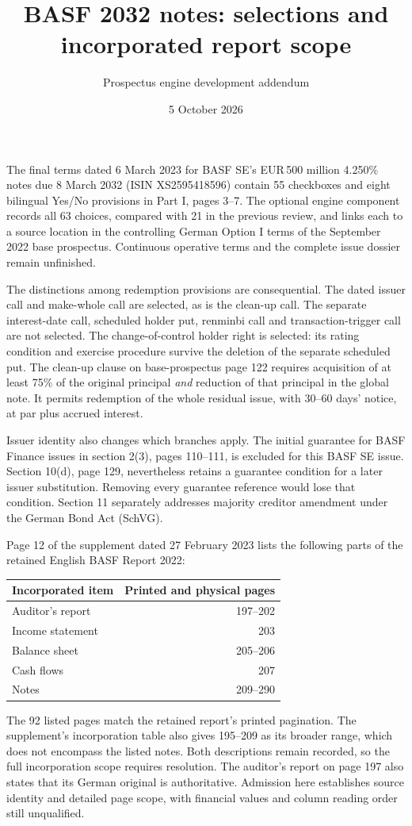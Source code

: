 \documentclass[11pt]{article}
\title{BASF 2032 notes: selections and incorporated report scope}
\author{Prospectus engine development addendum}
\date{5 October 2026}
\begin{document}
\maketitle
The final terms dated 6 March 2023 for BASF SE's EUR\,500 million
4.250\% notes due 8 March 2032 (ISIN XS2595418596) contain 55 checkboxes
and eight bilingual Yes/No provisions in Part I, pages 3--7. The optional
engine component records all 63 choices, compared with 21 in the previous
review, and links each to a source location in the controlling German
Option I terms of the September 2022 base prospectus. Continuous
operative terms and the complete issue dossier remain unfinished.

The distinctions among redemption provisions are consequential. The
dated issuer call and make-whole call are selected, as is the clean-up
call. The separate interest-date call, scheduled holder put, renminbi
call and transaction-trigger call are not selected. The
change-of-control holder right is selected: its rating condition and
exercise procedure survive the deletion of the separate scheduled put.
The clean-up clause on base-prospectus page 122 requires acquisition of
at least 75\% of the original principal \emph{and} reduction of that
principal in the global note. It permits redemption of the whole
residual issue, with 30--60 days' notice, at par plus accrued interest.

Issuer identity also changes which branches apply. The initial guarantee
for BASF Finance issues in section 2(3), pages 110--111, is excluded for
this BASF SE issue. Section 10(d), page 129, nevertheless retains a
guarantee condition for a later issuer substitution. Removing every
guarantee reference would lose that condition. Section 11 separately
addresses majority creditor amendment under the German Bond Act (SchVG).

Page 12 of the supplement dated 27 February 2023 lists the following
parts of the retained English BASF Report 2022:
\begin{center}
\begin{tabular}{lr}
\toprule
Incorporated item & Printed and physical pages\\
\midrule
Auditor's report &197--202\\
Income statement &203\\
Balance sheet &205--206\\
Cash flows &207\\
Notes &209--290\\
\bottomrule
\end{tabular}
\end{center}
The 92 listed pages match the retained report's printed pagination. The
supplement's incorporation table also gives 195--209 as its broader range,
which does not encompass the listed notes. Both descriptions remain
recorded, so the full incorporation scope requires resolution.
The auditor's report on page 197 also states that its German original
is authoritative. Admission here establishes source identity and
detailed page scope, with financial values and column reading order
still unqualified.
\end{document}
